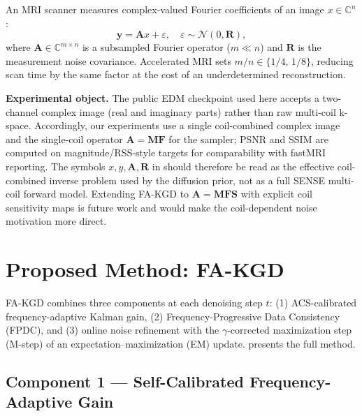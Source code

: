 \documentclass[10pt,twocolumn,letterpaper]{article}
\begin{document}
An MRI scanner measures complex-valued Fourier coefficients of an image
$x \in \mathbb{C}^n$:
\begin{equation}
  \mathbf{y} = \mathbf{A}x + \varepsilon, \quad
  \varepsilon \sim \mathcal{N}(0, \mathbf{R}),
  \label{eq:forward}
\end{equation}
where $\mathbf{A} \in \mathbb{C}^{m \times n}$ is a subsampled Fourier
operator ($m \ll n$) and $\mathbf{R}$ is the measurement noise covariance.
Accelerated MRI sets $m/n \in \{1/4,\, 1/8\}$, reducing scan time by the
same factor at the cost of an underdetermined reconstruction.

\textbf{Experimental object.} The public EDM checkpoint used here accepts a
two-channel complex image (real and imaginary parts) rather than raw multi-coil
k-space. Accordingly, our experiments use a single coil-combined complex image
and the single-coil operator $\mathbf{A}=\mathbf{M}\mathbf{F}$ for the sampler;
PSNR and SSIM are computed on magnitude/RSS-style targets for comparability
with fastMRI reporting. The symbols $x,y,\mathbf{A},\mathbf{R}$ in
 should therefore be read as the effective coil-combined
inverse problem used by the diffusion prior, not as a full SENSE multi-coil
forward model. Extending FA-KGD to $\mathbf{A}=\mathbf{M}\mathbf{F}\mathbf{S}$
with explicit coil sensitivity maps is future work and would make the
coil-dependent noise motivation more direct.

\section{Proposed Method: FA-KGD}
\label{sec:method}

FA-KGD combines three components at each denoising step $t$:
(1) ACS-calibrated frequency-adaptive Kalman gain, (2) Frequency-Progressive
Data Consistency (FPDC), and (3) online noise refinement with the
$\gamma$-corrected maximization step (M-step) of an
expectation--maximization (EM) update.  presents the full
method.

\subsection{Component 1 — Self-Calibrated Frequency-Adaptive Gain}
\end{document}

